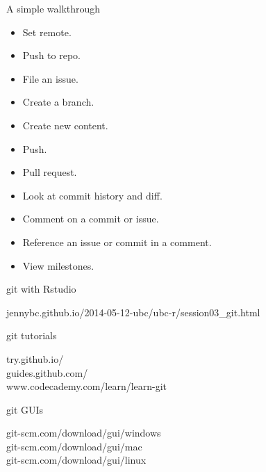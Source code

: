 \documentclass[12pt]{beamer}
\begin{document}
\begin{frame}

	\begin{flushright}
  	\Large \textcolor{boss2}{A simple walkthrough} 
	\end{flushright}

	\begin{itemize}
		\item Set remote. 
		\item Push to repo. 
		\item File an issue.  
		\item Create a branch. 
		\item Create new content. 
		\item Push. 
		\item Pull request. 
		\item Look at commit history and diff. 
		\item Comment on a commit or issue. 
		\item Reference an issue or commit in a comment. 
		\item View milestones.  
	\end{itemize}

\end{frame}








\begin{frame}

	\begin{flushright}
		{\Large \textcolor{boss2}{git with Rstudio}} \\
	\end{flushright}
		jennybc.github.io/2014-05-12-ubc/ubc-r/session03\_git.html \\
		\bigskip
	\begin{flushright}
		{\Large \textcolor{boss2}{git tutorials}} \\
	\end{flushright}
		try.github.io/ \\
		guides.github.com/ \\
		www.codecademy.com/learn/learn-git \\
		\bigskip
	\begin{flushright}
		{\Large \textcolor{boss2}{git GUIs}} \\
	\end{flushright}
		git-scm.com/download/gui/windows	\\
		git-scm.com/download/gui/mac \\
		git-scm.com/download/gui/linux \\
\end{frame}
\end{document}
